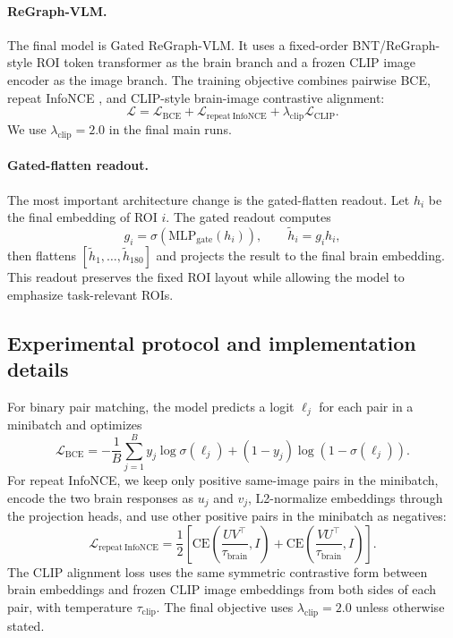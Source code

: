 \documentclass{article}
\begin{document}
\paragraph{ReGraph-VLM.}
The final model is Gated ReGraph-VLM. It uses a fixed-order BNT/ReGraph-style ROI token transformer as the brain branch and a frozen CLIP image encoder \citep{radford2021clip} as the image branch. The training objective combines pairwise BCE, repeat InfoNCE \citep{oord2018infonce}, and CLIP-style brain-image contrastive alignment:
\begin{equation}
  \mathcal{L} = \mathcal{L}_{\mathrm{BCE}} + \mathcal{L}_{\mathrm{repeat\ InfoNCE}} + \lambda_{\mathrm{clip}}\mathcal{L}_{\mathrm{CLIP}}.
\end{equation}
We use $\lambda_{\mathrm{clip}}=2.0$ in the final main runs.

\paragraph{Gated-flatten readout.}
The most important architecture change is the gated-flatten readout. Let $h_i$ be the final embedding of ROI $i$. The gated readout computes
\begin{equation}
  g_i = \sigma(\mathrm{MLP}_{\mathrm{gate}}(h_i)), \qquad \tilde{h}_i = g_i h_i,
\end{equation}
then flattens $[\tilde{h}_1,\ldots,\tilde{h}_{180}]$ and projects the result to the final brain embedding. This readout preserves the fixed ROI layout while allowing the model to emphasize task-relevant ROIs.

\subsection{Experimental protocol and implementation details}

For binary pair matching, the model predicts a logit $\ell_j$ for each pair in a minibatch and optimizes
\begin{equation}
  \mathcal{L}_{\mathrm{BCE}}
  = -\frac{1}{B}\sum_{j=1}^{B}
  y_j\log\sigma(\ell_j) + (1-y_j)\log(1-\sigma(\ell_j)).
\end{equation}
For repeat InfoNCE, we keep only positive same-image pairs in the minibatch, encode the two brain responses as $u_j$ and $v_j$, L2-normalize embeddings through the projection heads, and use other positive pairs in the minibatch as negatives:
\begin{equation}
  \mathcal{L}_{\mathrm{repeat\ InfoNCE}}
  = \frac{1}{2}\left[
  \mathrm{CE}\left(\frac{UV^\top}{\tau_{\mathrm{brain}}}, I\right)
  +
  \mathrm{CE}\left(\frac{VU^\top}{\tau_{\mathrm{brain}}}, I\right)
  \right].
\end{equation}
The CLIP alignment loss uses the same symmetric contrastive form between brain embeddings and frozen CLIP image embeddings from both sides of each pair, with temperature $\tau_{\mathrm{clip}}$. The final objective uses $\lambda_{\mathrm{clip}}=2.0$ unless otherwise stated.
\end{document}
